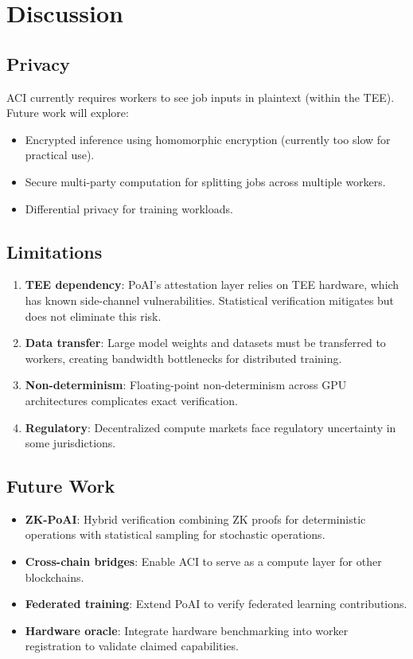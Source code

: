 \section{Discussion}

\label{sec:discussion}

\subsection{Privacy}

ACI currently requires workers to see job inputs in plaintext (within the TEE). Future work will explore:
\begin{itemize}[leftmargin=1.1em]
    \item Encrypted inference using homomorphic encryption (currently too slow for practical use).
    \item Secure multi-party computation for splitting jobs across multiple workers.
    \item Differential privacy for training workloads.
\end{itemize}

\subsection{Limitations}

\begin{enumerate}[leftmargin=1.4em]
    \item \textbf{TEE dependency}: PoAI's attestation layer relies on TEE hardware, which has known side-channel vulnerabilities. Statistical verification mitigates but does not eliminate this risk.
    \item \textbf{Data transfer}: Large model weights and datasets must be transferred to workers, creating bandwidth bottlenecks for distributed training.
    \item \textbf{Non-determinism}: Floating-point non-determinism across GPU architectures complicates exact verification.
    \item \textbf{Regulatory}: Decentralized compute markets face regulatory uncertainty in some jurisdictions.
\end{enumerate}

\subsection{Future Work}

\begin{itemize}[leftmargin=1.1em]
    \item \textbf{ZK-PoAI}: Hybrid verification combining ZK proofs for deterministic operations with statistical sampling for stochastic operations.
    \item \textbf{Cross-chain bridges}: Enable ACI to serve as a compute layer for other blockchains.
    \item \textbf{Federated training}: Extend PoAI to verify federated learning contributions.
    \item \textbf{Hardware oracle}: Integrate hardware benchmarking into worker registration to validate claimed capabilities.
\end{itemize}

